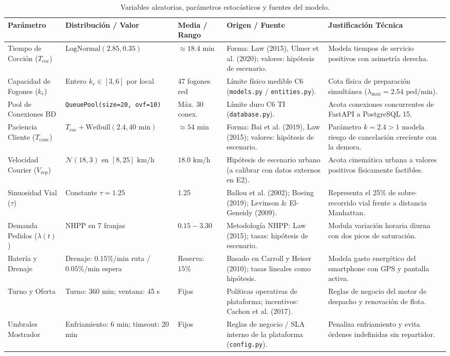 \documentclass[11pt,letterpaper]{article}
\begin{document}
\begin{table}[htbp]
\centering
\small
\caption{Variables aleatorias, parámetros estocásticos y fuentes del modelo.}
\begin{tabularx}{\textwidth}{p{3.5cm} p{3.2cm} p{2.2cm} p{3.5cm} X}
\toprule
\textbf{Parámetro} & \textbf{Distribución / Valor} & \textbf{Media / Rango} & \textbf{Origen / Fuente} & \textbf{Justificación Técnica} \\
\midrule
Tiempo de Cocción ($T_{\text{coc}}$) & $\text{LogNormal}(2.85, 0.35)$ & $\approx 18.4\text{ min}$ & Forma: Law (2015), Ulmer et al. (2020); valores: hipótesis de escenario. & Modela tiempos de servicio positivos con asimetría derecha. \\
Capacidad de Fogones ($k_r$) & Entero $k_r \in [3, 6]$ por local & 47 fogones red & Límite físico medible C6 (\texttt{models.py} / \texttt{entities.py}). & Cota física de preparación simultánea ($\lambda_{\max} = 2.54\text{ ped/min}$). \\
Pool de Conexiones BD & \texttt{QueuePool(size=20, ovf=10)} & Máx. 30 conex. & Límite duro C6 TI (\texttt{database.py}). & Acota conexiones concurrentes de FastAPI a PostgreSQL 15. \\
Paciencia Cliente ($T_{\text{canc}}$) & $T_{\text{coc}} + \text{Weibull}(2.4, 40\text{ min})$ & $\approx 54\text{ min}$ & Forma: Bai et al. (2019), Law (2015); valores: hipótesis de escenario. & Parámetro $k=2.4>1$ modela riesgo de cancelación creciente con la demora. \\
Velocidad Courier ($V_{\text{rep}}$) & $\mathcal{N}(18, 3)$ en $[8, 25]\text{ km/h}$ & $18.0\text{ km/h}$ & Hipótesis de escenario urbano (a calibrar con datos externos en E2). & Acota cinemática urbana a valores positivos físicamente factibles. \\
Sinuosidad Vial ($\tau$) & Constante $\tau = 1.25$ & 1.25 & Ballou et al. (2002); Boeing (2019); Levinson \& El-Geneidy (2009). & Representa el 25\% de sobre-recorrido vial frente a distancia Manhattan. \\
Demanda Pedidos ($\lambda(t)$) & NHPP en 7 franjas & $0.15 - 3.30$ & Metodología NHPP: Law (2015); tasas: hipótesis de escenario. & Modula variación horaria diurna con dos picos de saturación. \\
Batería y Drenaje & Drenaje: $0.15\%/\text{min}$ ruta / $0.05\%/\text{min}$ espera & Reserva: $15\%$ & Basado en Carroll y Heiser (2010); tasas lineales como hipótesis. & Modela gasto energético del smartphone con GPS y pantalla activa. \\
Turno y Oferta & Turno: $360\text{ min}$; ventana: 45 s & Fijos & Políticas operativas de plataforma; incentivos: Cachon et al. (2017). & Reglas de negocio del motor de despacho y renovación de flota. \\
Umbrales Mostrador & Enfriamiento: 6 min; timeout: 20 min & Fijos & Reglas de negocio / SLA interno de la plataforma (\texttt{config.py}). & Penaliza enfriamiento y evita órdenes indefinidas sin repartidor. \\
\bottomrule
\end{tabularx}
\end{table}
\end{document}
